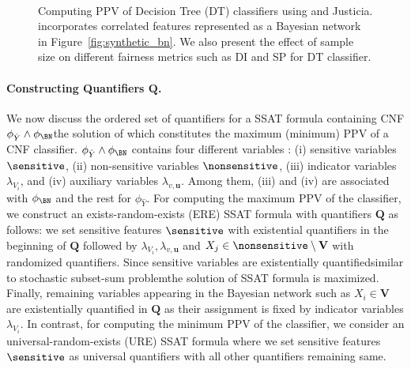 \begin{figure}[!t]
	\begin{center}
		\\
		
		
	\end{center}
	
	\caption{
		Computing PPV of Decision Tree (DT) classifiers using {\framework} and Justicia. {\framework} incorporates correlated features represented as a Bayesian network in Figure~\ref{fig:synthetic_bn}. We also present the effect of sample size on different fairness metrics such as DI and SP for DT classifier. }
	\label{fig:synthetic_results}
\end{figure}

\paragraph{Constructing Quantifiers $ \mathbf{Q} $.}
We now discuss the ordered set of quantifiers for a SSAT formula containing CNF $ \phi_{\hat{Y}} \wedge \phi_\BN $\textemdash the solution of which constitutes the maximum (minimum) PPV of a CNF classifier. $ \phi_{\hat{Y}} \wedge \phi_\BN $ contains four different variables : (i) sensitive variables $ \sensitive $, (ii) non-sensitive variables $ \nonsensitive $, (iii) indicator variables $  \lambda_{V_i} $, and (iv) auxiliary variables $ \lambda_{v,\mathbf{u}} $. Among them, (iii) and (iv) are associated with $ \phi_\BN $ and the rest for $ \phi_{\hat{Y}} $. For computing the maximum PPV of the classifier, we construct  an exists-random-exists (ERE) SSAT formula with quantifiers $\mathbf{Q}$ as follows: we set sensitive features $ \sensitive $ with existential quantifiers in the beginning of $ \mathbf{Q} $ followed by $  \lambda_{V_i}, \lambda_{v,\mathbf{u}} $ and $ X_j \in \nonsensitive \setminus \mathbf{V} $ with randomized quantifiers. Since sensitive variables are existentially quantified\textemdash similar to stochastic subset-sum problem\textemdash the solution of SSAT formula is maximized.
Finally, remaining variables appearing in the Bayesian network such as $ X_i \in \mathbf{V} $ are existentially quantified in $\mathbf{Q}$ as their assignment is fixed by indicator variables $ \lambda_{V_i} $. In contrast, for computing the minimum PPV of the classifier, we consider an universal-random-exists (URE) SSAT formula  where we set sensitive features $ \sensitive $ as universal quantifiers with all other quantifiers remaining same.


